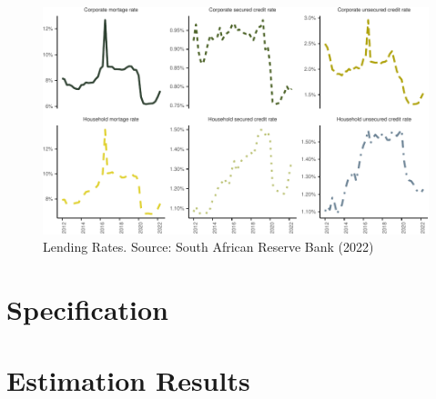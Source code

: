 \documentclass[
]{article}
\begin{document}
\begin{figure}[H]

\includegraphics{Bank_capital_and_bank_lending_files/figure-latex/unnamed-chunk-7-1} \hfill{}

\caption{Lending Rates. Source: South African Reserve Bank (2022)}\label{fig:unnamed-chunk-7}
\end{figure}

\newpage

\hypertarget{specification}{%
\section{Specification}\label{specification}}

\hypertarget{estimation-results}{%
\section{Estimation Results}\label{estimation-results}}

\providecommand{\docline}[3]{\noalign{\global\setlength{\arrayrulewidth}{#1}}\arrayrulecolor[HTML]{#2}\cline{#3}}

\setlength{\tabcolsep}{0pt}

\renewcommand*{\arraystretch}{0.6}
\end{document}
